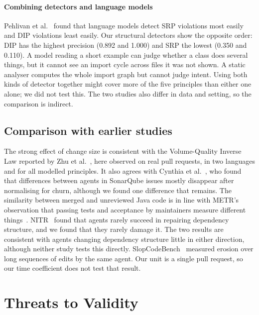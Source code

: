 \documentclass[sigconf]{acmart}
\begin{document}
\paragraph{Combining detectors and language models} Pehlivan et al.~\cite{pehlivan2025solid} found
that language models detect SRP violations most easily and DIP violations least easily. Our
structural detectors show the opposite order: DIP has the highest precision (0.892 and 1.000) and SRP
the lowest (0.350 and 0.110). A model reading a short example can judge whether a class does several
things, but it cannot see an import cycle across files it was not shown. A static analyser computes
the whole import graph but cannot judge intent. Using both kinds of detector together might cover
more of the five principles than either one alone; we did not test this. The two studies also differ
in data and setting, so the comparison is indirect.

\subsection{Comparison with earlier studies}

The strong effect of change size is consistent with the Volume-Quality Inverse Law reported by Zhu et
al.~\cite{zhu2026smells}, here observed on real pull requests, in two languages and for all modelled
principles. It also agrees with Cynthia et al.~\cite{cynthia2026postmerge}, who found that
differences between agents in SonarQube issues mostly disappear after normalising for churn, although
we found one difference that remains. The similarity between merged and unreviewed Java code is in
line with METR's observation that passing tests and acceptance by maintainers measure different
things~\cite{metr2026sweverified}. NITR~\cite{zhu2026nitr} found that agents rarely succeed in
repairing dependency structure, and we found that they rarely damage it. The two results are
consistent with agents changing dependency structure little in either direction, although neither
study tests this directly. SlopCodeBench~\cite{slopcodebench2026}
measured erosion over long sequences of edits by the same agent. Our unit is a single pull request,
so our time coefficient does not test that result.

\section{Threats to Validity}
\label{sec:threats}
\end{document}
